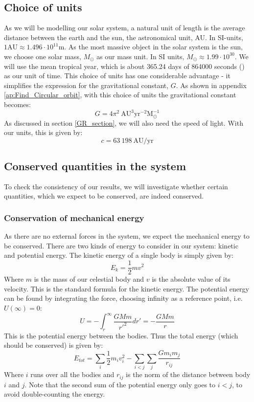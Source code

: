 \documentclass[a4paper, 10pt]{article}
\begin{document}
\subsection{Choice of units}
As we will be modelling our solar system, a natural unit of length is the average distance between the earth and the sun, the astronomical unit, AU. In SI-units, $1 \mathrm{AU} \approx 1.496 \cdot 10^{11} \mathrm{m}$. As the most massive object in the solar system is the sun, we choose one solar mass, $M_{\odot}$ as our mass unit. In SI units, $M_{\odot} \approx 1.99 \cdot 10^{30}$. We will use the mean tropical year, which is about 365.24 days of 864000 seconds (\cite{Tropical_year}) as our unit of time. This choice of units has one considerable advantage - it simplifies the expression for the gravitational constant, $G$. As shown in appendix \ref{ap:Find_Circular_orbit}, with this choice of units the gravitational constant becomes:
$$G=4\pi^2 \ \mathrm{AU^{3}yr^{-2}M_{\odot}^{-1}}$$
As discussed in section \ref{GR_section}, we will also need the speed of light. With our units, this is given by:
$$c=63\ 198 \ \mathrm{AU/yr}$$
\subsection{Conserved quantities in the system}\label{conservation_of_energy}
To check the consistency of our results, we will investigate whether certain quantities, which we expect to be conserved, are indeed conserved.
\subsubsection{Conservation of mechanical energy}
As there are no external forces in the system, we expect the mechanical energy to be conserved. There are two kinds of energy to consider in our system: kinetic and potential energy. The kinetic energy of a single body is simply given by:
$$E_{k}=\frac{1}{2}mv^2$$
Where $m$ is the mass of our celestial body and $v$ is the absolute value of its velocity. This is the standard formula for the kinetic energy. The potential energy can be found by integrating the force, choosing infinity as a reference point, i.e. $U(\infty)=0$:
$$U=-\int_r^{\infty} \frac{GMm}{r'^2} dr'=-\frac{GMm}{r}$$
This is the potential energy between the bodies. Thus the total energy (which should be conserved) is given by:
\begin{equation}\label{eq:total_energy}
E_{tot}=\sum_{i} \frac{1}{2}m_iv_i^2 - \sum_{i<j}\sum_{j}\frac{Gm_im_j}{r_{ij}}
\end{equation}
Where $i$ runs over all the bodies and $r_{ij}$ is the norm of the distance between body $i$ and $j$. Note that the second sum of the potential energy only goes to $i<j$, to avoid double-counting the energy.
\end{document}
